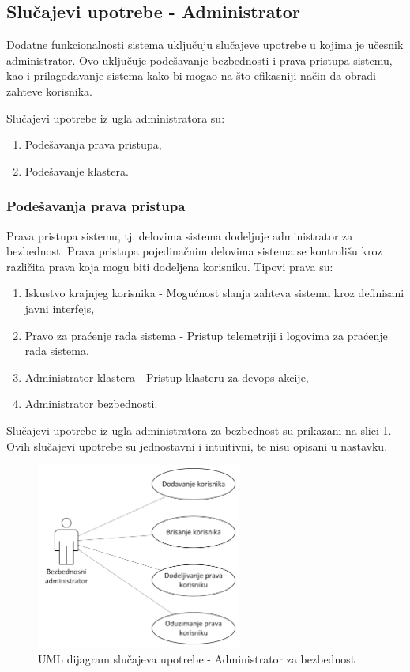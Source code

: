 \documentclass[12pt,oneside]{memoir}
\begin{document}
\subsection{Slučajevi upotrebe - Administrator}

Dodatne funkcionalnosti sistema uključuju slučajeve upotrebe u kojima je učesnik administrator. Ovo uključuje podešavanje bezbednosti i prava pristupa sistemu, kao i prilagođavanje sistema kako bi mogao na što efikasniji način da obradi zahteve korisnika.

Slučajevi upotrebe iz ugla administratora su:
\begin{enumerate}
\item Podešavanja prava pristupa,
\item Podešavanje klastera.
\end{enumerate}

\subsubsection{Podešavanja prava pristupa}
Prava pristupa sistemu, tj. delovima sistema dodeljuje administrator za bezbednost. Prava pristupa pojedinačnim delovima sistema se kontrolišu kroz različita prava koja mogu biti dodeljena korisniku. Tipovi prava su:
	\begin{enumerate}
	\item Iskustvo krajnjeg korisnika - Mogućnost slanja zahteva sistemu kroz definisani javni interfejs,
	\item Pravo za praćenje rada sistema - Pristup telemetriji i logovima za praćenje rada sistema,
	\item Administrator klastera - Pristup klasteru za devops akcije,
	\item Administrator bezbednosti.
	\end{enumerate}
Slučajevi upotrebe iz ugla administratora za bezbednost su prikazani na slici \ref{fig:slucajupotrebe_aadadmin}. Ovih slučajevi upotrebe su jednostavni i intuitivni, te nisu opisani u nastavku.

\begin{figure}[!ht]
  \centering
  \includegraphics[width=0.6\textwidth]{./images/dijagram_slucajeva_upotrebe_administrator_sistema_aadadmin.png}
  \caption{UML dijagram slučajeva upotrebe - Administrator za bezbednost}
  \label{fig:slucajupotrebe_aadadmin}
\end{figure}
\end{document}
